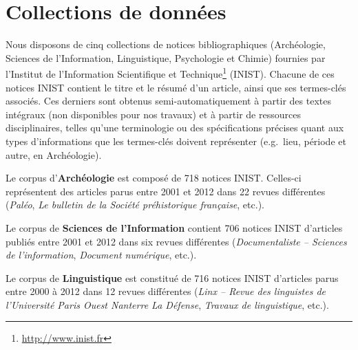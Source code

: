 \section{Collections de données}
\label{sec:presentation_des_donnees}
  Nous disposons de cinq collections de notices bibliographiques (Archéologie,
  Sciences de l'Information, Linguistique, Psychologie et Chimie) fournies par
  l'Institut de l’Information Scientifique et
  Technique\footnote{\url{http://www.inist.fr}} (INIST). Chacune de ces notices
  INIST contient le titre et le résumé d'un article, ainsi que ses termes-clés
  associés. Ces derniers sont obtenus semi-automatiquement %
  à partir des textes intégraux (non disponibles pour nos travaux) et à partir
  de ressources disciplinaires, telles qu'une terminologie ou des spécifications
  précises quant aux types d'informations que les termes-clés doivent
  représenter (e.g.~lieu, période et autre, en Archéologie).

  Le corpus d'\textbf{Archéologie} est composé de 718 notices INIST. Celles-ci
  représentent des articles parus entre 2001 et 2012 dans 22 revues différentes
  (\textit{Paléo}, \textit{Le bulletin de la Société préhistorique française},
  etc.).

  Le corpus de \textbf{Sciences de l'Information} contient 706 notices INIST
  d'articles publiés entre 2001 et 2012 dans six revues différentes
  (\textit{Documentaliste -- Sciences de l'information}, \textit{Document
  numérique}, etc.).

  Le corpus de \textbf{Linguistique} est constitué de 716 notices INIST
  d'articles parus entre 2000 à 2012 dans 12 revues différentes
  (\textit{Linx -- Revue des linguistes de l'Université Paris Ouest Nanterre La
  Défense}, \textit{Travaux de linguistique}, etc.).


